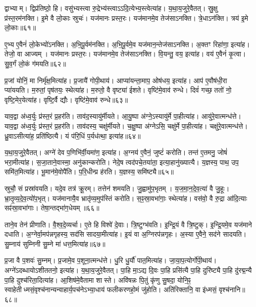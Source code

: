 द्वाभ्याम्।
द्विप्र॑तिष्ठो॒ हि।
वसु॑भ्यस्त्वा रु॒द्रेभ्य॑स्त्वा\-ऽऽदि॒त्येभ्य॒स्त्वेत्या॑ह।
य॒था॒य॒जुरे॒वैतत्।
स्रु॒क्षु प्र॑स्त॒रम॑नक्ति।
इ॒मे वै लो॒काः स्रुचः॑।
यज॑मानः प्रस्त॒रः।
यज॑मानमे॒व तेज॑सा\-ऽनक्ति।
त्रे॒धा\-ऽन॑क्ति।
त्रय॑ इ॒मे लो॒काः॥६१॥

ए॒भ्य ए॒वैनं॑ लो॒केभ्यो॑\-ऽनक्ति।
अ॒भि॒पू॒र्वम॑नक्ति।
अ॒भि॒पू॒र्वमे॒व यज॑मान॒न्तेज॑सा\-ऽनक्ति।
अ॒क्तꣳ रिहा॑णा॒ इत्या॑ह।
तेजो॒ वा आज्यम्।
यज॑मानः प्रस्त॒रः।
यज॑मानमे॒व तेज॑सा\-ऽनक्ति।
वि॒यन्तु॒ वय॒ इत्या॑ह।
वय॑ ए॒वैनं॑ कृ॒त्वा।
सु॒व॒र्गं लो॒कं ग॑मयति॥६२॥

प्र॒जां योनिं॒ मा निर्मृ॑क्ष॒मित्या॑ह।
प्र॒जायै॑ गोपी॒थाय॑।
आप्या॑यन्ता॒माप॒ ओष॑धय॒ इत्या॑ह।
आप॑ ए॒वौष॑धी॒रा प्या॑ययति।
म॒रुतां॒ पृष॑तयः॒ स्थेत्या॑ह।
म॒रुतो॒ वै वृष्ट्या॑ ईशते।
वृष्टि॑मे॒वाव॑ रुन्धे।
दिवं॑ गच्छ॒ ततो॑ नो॒ वृष्टि॒मेर॒येत्या॑ह।
वृष्टि॒र्वै द्यौः।
वृष्टि॑मे॒वाव॑ रुन्धे॥६३॥

याव॒द्वा अ॑ध्व॒र्युः प्र॑स्त॒रं प्र॒हर॑ति।
ताव॑द॒स्यायु॑र्मीयते।
आ॒यु॒ष्पा अ॑ग्ने॒\-ऽस्यायु॑र्मे पा॒हीत्या॑ह।
आयु॑रे॒वात्मन्ध॑त्ते।
याव॒द्वा अ॑ध्व॒र्युः प्र॑स्त॒रं प्र॒हर॑ति।
ताव॑दस्य॒ चक्षु॑र्मीयते।
च॒क्षु॒ष्पा अ॑ग्नेऽसि॒ चक्षु॑र्मे पा॒हीत्या॑ह।
चक्षु॑रे॒वात्मन्ध॑त्ते।
ध्रु॒वा\-ऽसीत्या॑ह॒ प्रति॑ष्ठित्यै।
यं प॑रि॒धिं प॒र्यध॑त्था॒ इत्या॑ह॥६४॥

य॒था॒य॒जुरे॒वैतत्।
अग्ने॑ देव प॒णिभि॑र्वी॒यमा॑ण॒ इत्या॑ह।
अ॒ग्नय॑ ए॒वैनं॒ जुष्टं॑ करोति।
तन्त॑ ए॒तमनु॒ जोषं॑ भरा॒मीत्या॑ह।
स॒जा॒ताने॒वास्मा॒ अनु॑कान्करोति।
नेदे॒ष त्वद॑पचे॒तया॑ता॒ इत्या॒हानु॑ख्यात्यै।
य॒ज्ञस्य॒ पाथ॒ उप॒ समि॑त॒मित्या॑ह।
भू॒मान॑मे॒वोपै॑ति।
प॒रि॒धीन्प्र ह॑रति।
य॒ज्ञस्य॒ समि॑ष्ट्यै॥६५॥

स्रुचौ॒ सं प्रस्रा॑वयति।
यदे॒व तत्र॑ क्रू॒रम्।
तत्तेन॑ शमयति।
जु॒ह्वामु॑प॒भृतम्।
य॒ज॒मा॒न॒दे॒व॒त्या॑ वै जु॒हूः।
भ्रा॒तृ॒व्य॒दे॒व॒त्यो॑प॒भृत्।
यज॑मानायै॒व भ्रातृ॑व्य॒मुप॑स्तिं करोति।
स॒ꣴ॒स्रा॒वभा॑गाः॒ स्थेत्या॑ह।
वस॑वो॒ वै रु॒द्रा आ॑दि॒त्याः सꣴ॑स्रा॒वभा॑गाः।
तेषा॒न्तद्भा॑ग॒धेयम्॥६६॥

ताने॒व तेन॑ प्रीणाति।
वै॒श्व॒दे॒व्यर्चा।
ए॒ते हि विश्वे॑ दे॒वाः।
त्रि॒ष्टुग्भ॑वति।
इ॒न्द्रि॒यं वै त्रि॒ष्टुक्।
इ॒न्द्रि॒यमे॒व यज॑माने दधाति।
अ॒ग्नेर्वा॒मप॑न्नगृहस्य॒ सद॑सि सादया॒मीत्या॑ह।
इ॒यं वा अ॒ग्निरप॑न्नगृहः।
अ॒स्या ए॒वैने॒ सद॑ने सादयति।
सु॒म्नाय॑ सुम्निनी सु॒म्ने मा॑ धत्त॒मित्या॑ह॥६७॥

प्र॒जा वै प॒शवः॑ सु॒म्नम्।
प्र॒जामे॒व प॒शूना॒त्मन्ध॑त्ते।
धु॒रि धु॒र्यौ॑ पात॒मित्या॑ह।
जा॒या॒प॒त्योर्गो॑पी॒थाय॑।
अग्ने॑\-ऽदब्धायो\-ऽशीततनो॒ इत्या॑ह।
य॒था॒य॒जुरे॒वैतत्।
पा॒हि मा॒ऽद्य दि॒वः पा॒हि प्रसि॑त्यै पा॒हि दुरि॑ष्ट्यै पा॒हि दु॑रद्म॒न्यै पा॒हि दुश्च॑रिता॒दित्या॑ह।
आ॒शिष॑मे॒वैतामा शास्ते।
अवि॑षन्नः पि॒तुं कृ॑णु सु॒षदा॒ योनि॒ꣴ॒ स्वाहेतीध्मसं॒वृश्च॑नान्यन्वाहार्य॒पच॑ने\-ऽभ्या॒धाय॑ फलीकरणहो॒मं जु॑होति।
अति॑रिक्तानि॒ वा इ॑ध्मसं॒ वृश्च॑नानि॥६८॥

